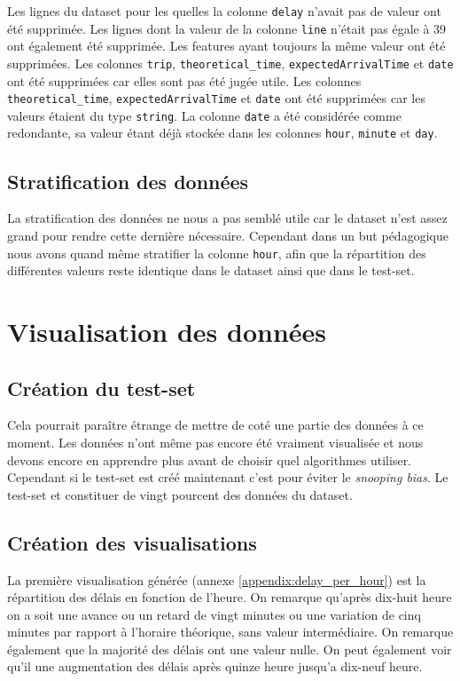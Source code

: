 \documentclass[12pt]{report}
\begin{document}
Les lignes du dataset pour les quelles la colonne \lstinline!delay! n'avait pas de valeur ont été supprimée. Les lignes dont la valeur de la colonne \lstinline!line! n'était pas égale à 39 ont également été supprimée. Les features ayant toujours la même valeur ont été supprimées. Les colonnes \lstinline!trip!, \lstinline!theoretical_time!, \lstinline!expectedArrivalTime! et \lstinline!date! ont été supprimées car elles sont pas été jugée utile. Les colonnes \lstinline!theoretical_time!, \lstinline!expectedArrivalTime! et \lstinline!date! ont été supprimées car les valeurs étaient du type \lstinline!string!. La colonne \lstinline!date! a été considérée comme redondante, sa valeur étant déjà stockée dans les colonnes \lstinline!hour!, \lstinline!minute! et \lstinline!day!.

\subsection{Stratification des données}
La stratification des données ne nous a pas semblé utile car le dataset n'est assez grand pour rendre cette dernière nécessaire. Cependant dans un but pédagogique nous avons quand même stratifier la colonne \lstinline!hour!, afin que la répartition des différentes valeurs reste identique dans le dataset ainsi que dans le test-set.

\section{Visualisation des données}
\subsection{Création du test-set}
Cela pourrait paraître étrange de mettre de coté une partie des données à ce moment. Les données n'ont même pas encore été vraiment visualisée et nous devons encore en apprendre plus avant de choisir quel algorithmes utiliser. Cependant si le test-set est créé maintenant c'est pour éviter le \textit{snooping bias}. Le test-set et constituer de vingt pourcent des données du dataset. 

\subsection{Création des visualisations}
La première visualisation générée (annexe \ref{appendix:delay_per_hour}) est la répartition des délais en fonction de l'heure. On remarque qu'après dix-huit heure on a soit une avance ou un retard de vingt minutes ou une variation de cinq minutes par rapport à l'horaire théorique, sans valeur intermédiaire. On remarque également que la majorité des délais ont une valeur nulle. On peut également voir qu'il une augmentation des délais après quinze heure jusqu'a dix-neuf heure.
\end{document}
